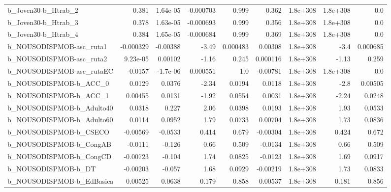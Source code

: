 \begin{tabular}{lrrrrrrrr}
b\_Joven30-b\_Htrab\_2          &       0.381 &     1.64e-05 & -0.000703 &    0.999 &      0.362 &    1.8e+308 &     1.8e+308 &           0.0 \\
b\_Joven30-b\_Htrab\_3          &       0.378 &     1.63e-05 & -0.000693 &    0.999 &      0.356 &    1.8e+308 &     1.8e+308 &           0.0 \\
b\_Joven30-b\_Htrab\_4          &       0.384 &     1.65e-05 & -0.000684 &    0.999 &      0.369 &    1.8e+308 &     1.8e+308 &           0.0 \\
b\_NOUSODISPMOB-asc\_ruta1     &   -0.000329 &     -0.00388 &     -3.49 & 0.000483 &    0.00308 &    1.8e+308 &         -3.4 &      0.000685 \\
b\_NOUSODISPMOB-asc\_ruta2     &    9.23e-05 &      0.00102 &     -1.16 &    0.245 &   0.000116 &    1.8e+308 &        -1.13 &         0.259 \\
b\_NOUSODISPMOB-asc\_rutaEC    &     -0.0157 &     -1.7e-06 &  0.000551 &      1.0 &   -0.00781 &    1.8e+308 &     1.8e+308 &           0.0 \\
b\_NOUSODISPMOB-b\_ACC\_0       &      0.0129 &       0.0376 &     -2.34 &   0.0194 &     0.0118 &    1.8e+308 &         -2.8 &       0.00505 \\
b\_NOUSODISPMOB-b\_ACC\_1       &     0.00455 &       0.0131 &     -1.92 &   0.0554 &     0.0031 &    1.8e+308 &        -2.24 &        0.0248 \\
b\_NOUSODISPMOB-b\_Adulto40    &      0.0318 &        0.227 &      2.06 &   0.0398 &     0.0193 &    1.8e+308 &         1.93 &        0.0533 \\
b\_NOUSODISPMOB-b\_Adulto60    &      0.0114 &       0.0952 &      1.79 &   0.0733 &    0.00704 &    1.8e+308 &         1.73 &        0.0836 \\
b\_NOUSODISPMOB-b\_CSECO       &    -0.00569 &      -0.0533 &     0.414 &    0.679 &   -0.00304 &    1.8e+308 &        0.424 &         0.672 \\
b\_NOUSODISPMOB-b\_CongAB      &     -0.0111 &       -0.126 &      0.66 &    0.509 &    -0.0134 &    1.8e+308 &         0.66 &         0.509 \\
b\_NOUSODISPMOB-b\_CongCD      &    -0.00723 &       -0.104 &      1.74 &   0.0825 &    -0.0123 &    1.8e+308 &         1.69 &        0.0917 \\
b\_NOUSODISPMOB-b\_DT          &    -0.00203 &       -0.057 &      1.68 &   0.0929 &   -0.00219 &    1.8e+308 &         1.73 &        0.0833 \\
b\_NOUSODISPMOB-b\_EdBasica    &     0.00525 &       0.0638 &     0.179 &    0.858 &    0.00537 &    1.8e+308 &        0.181 &         0.856 \\

\end{tabular}
